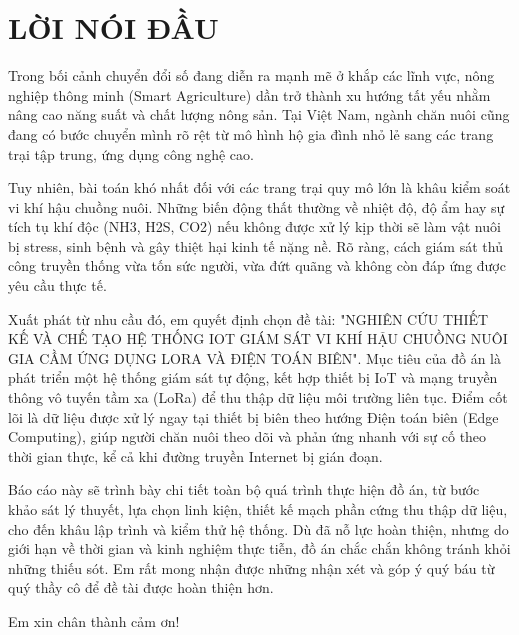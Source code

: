 \newpage
\section*{LỜI NÓI ĐẦU}
\thispagestyle{empty}
Trong bối cảnh chuyển đổi số đang diễn ra mạnh mẽ ở khắp các lĩnh vực, nông nghiệp thông minh (Smart Agriculture) dần trở thành xu hướng tất yếu nhằm nâng cao năng suất và chất lượng nông sản. Tại Việt Nam, ngành chăn nuôi cũng đang có bước chuyển mình rõ rệt từ mô hình hộ gia đình nhỏ lẻ sang các trang trại tập trung, ứng dụng công nghệ cao.

Tuy nhiên, bài toán khó nhất đối với các trang trại quy mô lớn là khâu kiểm soát vi khí hậu chuồng nuôi. Những biến động thất thường về nhiệt độ, độ ẩm hay sự tích tụ khí độc (NH3, H2S, CO2) nếu không được xử lý kịp thời sẽ làm vật nuôi bị stress, sinh bệnh và gây thiệt hại kinh tế nặng nề. Rõ ràng, cách giám sát thủ công truyền thống vừa tốn sức người, vừa đứt quãng và không còn đáp ứng được yêu cầu thực tế.

Xuất phát từ nhu cầu đó, em quyết định chọn đề tài: "NGHIÊN CỨU THIẾT KẾ VÀ CHẾ TẠO HỆ THỐNG IOT GIÁM SÁT VI KHÍ HẬU CHUỒNG NUÔI GIA CẦM ỨNG DỤNG LORA VÀ ĐIỆN TOÁN BIÊN". Mục tiêu của đồ án là phát triển một hệ thống giám sát tự động, kết hợp thiết bị IoT và mạng truyền thông vô tuyến tầm xa (LoRa) để thu thập dữ liệu môi trường liên tục. Điểm cốt lõi là dữ liệu được xử lý ngay tại thiết bị biên theo hướng Điện toán biên (Edge Computing), giúp người chăn nuôi theo dõi và phản ứng nhanh với sự cố theo thời gian thực, kể cả khi đường truyền Internet bị gián đoạn.

Báo cáo này sẽ trình bày chi tiết toàn bộ quá trình thực hiện đồ án, từ bước khảo sát lý thuyết, lựa chọn linh kiện, thiết kế mạch phần cứng thu thập dữ liệu, cho đến khâu lập trình và kiểm thử hệ thống. Dù đã nỗ lực hoàn thiện, nhưng do giới hạn về thời gian và kinh nghiệm thực tiễn, đồ án chắc chắn không tránh khỏi những thiếu sót. Em rất mong nhận được những nhận xét và góp ý quý báu từ quý thầy cô để đề tài được hoàn thiện hơn.

Em xin chân thành cảm ơn!

\cleardoublepage